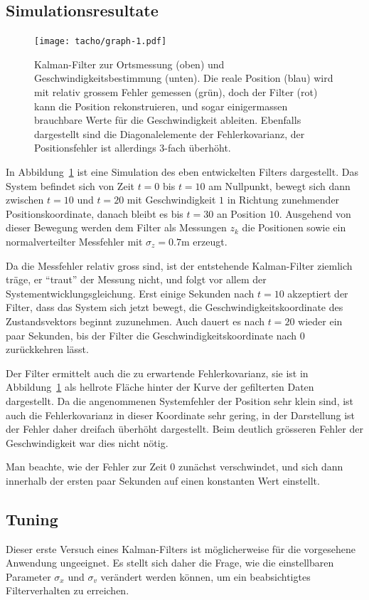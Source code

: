 \subsection{Simulationsresultate}
\begin{figure}
\centering
\texttt{[image: tacho/graph-1.pdf]}
\caption{Kalman-Filter zur Ortsmessung (oben) und Geschwindigkeitsbestimmung
(unten).
Die reale Position ({\color{blue}blau}) wird mit relativ grossem
Fehler gemessen ({\color{green}grün}), doch der Filter ({\color{red}rot})
kann die Position rekonstruieren, und sogar einigermassen brauchbare
Werte für die Geschwindigkeit ableiten.
Ebenfalls dargestellt sind die Diagonalelemente der Fehlerkovarianz,
der Positionsfehler ist allerdings 3-fach überhöht.
\label{tacho-graph}}
\end{figure}
In Abbildung~\ref{tacho-graph} ist eine Simulation des eben entwickelten
Filters dargestellt.
Das System befindet sich von Zeit $t=0$ bis $t=10$ am Nullpunkt, bewegt
sich dann zwischen $t=10$ und $t=20$ mit Geschwindigkeit $1$ in Richtung
zunehmender Positionskoordinate, danach bleibt es bis $t=30$ an Position $10$.
Ausgehend von dieser Bewegung werden dem Filter als Messungen $z_k$ die
Positionen sowie ein normalverteilter Messfehler mit $\sigma_z=0.7\text{m}$
erzeugt.

Da die Messfehler relativ gross sind, ist der entstehende Kalman-Filter
ziemlich träge, er ``traut'' der Messung nicht, und folgt vor allem der
Systementwicklungsgleichung.
Erst einige Sekunden nach $t=10$ akzeptiert der Filter, dass das System
sich jetzt bewegt, die Geschwindigkeitskoordinate des Zustandsvektors beginnt
zuzunehmen.
Auch dauert es nach $t=20$ wieder ein paar Sekunden, bis der Filter
die Geschwindigkeitskoordinate nach $0$ zurückkehren lässt.

Der Filter ermittelt auch die zu erwartende Fehlerkovarianz, sie ist
in Abbildung~\ref{tacho-graph} als hellrote Fläche hinter der
Kurve der gefilterten Daten dargestellt.
Da die angenommenen Systemfehler der Position sehr klein sind, ist auch die
Fehlerkovarianz in dieser Koordinate sehr gering, in der Darstellung
ist der Fehler daher dreifach überhöht dargestellt.
Beim deutlich grösseren Fehler der Geschwindigkeit war dies nicht
nötig.

Man beachte, wie der Fehler zur Zeit $0$ zunächst verschwindet, und
sich dann innerhalb der ersten paar Sekunden auf einen konstanten
Wert einstellt.

\subsection{Tuning}
Dieser erste Versuch eines Kalman-Filters ist möglicherweise für
die vorgesehene Anwendung ungeeignet.
Es stellt sich daher die Frage, wie die einstellbaren Parameter
$\sigma_x$ und $\sigma_v$ verändert werden können,
um ein beabsichtigtes Filterverhalten zu erreichen.

